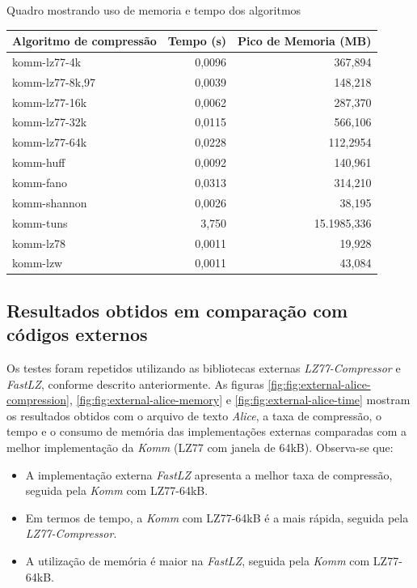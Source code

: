 \begin{quadro}[ht]
\caption{Quadro mostrando uso de memoria e tempo dos algoritmos}\label{quadro:resultados-komm-smiley}
\begin{tabular}{|l|r|r|}
    \hline
    \textbf{Algoritmo de compressão}& \textbf{Tempo (s)}  & \textbf{Pico de Memoria (MB)} \\ \hline
    komm-lz77-4k & 0,0096 & 367,894 \\ \hline
    komm-lz77-8k,97 & 0,0039 & 148,218 \\ \hline
    komm-lz77-16k & 0,0062 & 287,370 \\ \hline
    komm-lz77-32k & 0,0115 & 566,106 \\ \hline
    komm-lz77-64k & 0,0228 & 112,2954 \\ \hline
    komm-huff & 0,0092 & 140,961 \\ \hline
    komm-fano & 0,0313 & 314,210 \\ \hline
    komm-shannon & 0,0026 & 38,195 \\ \hline
    komm-tuns & 3,750 & 15.1985,336 \\ \hline
    komm-lz78 & 0,0011 & 19,928 \\ \hline
    komm-lzw & 0,0011 & 43,084 \\ \hline

\end{tabular}
\fonteproprioautor
\end{quadro}

\newpage
\newpage

\subsection{Resultados obtidos em comparação com códigos externos}

Os testes foram repetidos utilizando as bibliotecas externas \textit{LZ77-Compressor} e \textit{FastLZ}, conforme descrito anteriormente. As figuras \ref{fig:fig:external-alice-compression}, \ref{fig:fig:external-alice-memory} e \ref{fig:fig:external-alice-time} mostram os resultados obtidos com o arquivo de texto \textit{Alice}, a taxa de compressão, o tempo e o consumo de memória das implementações externas comparadas com a melhor implementação da \textit{Komm} (LZ77 com janela de 64kB). Observa-se que:
\begin{itemize}
  \item A implementação externa \textit{FastLZ} apresenta a melhor taxa de compressão, seguida pela \textit{Komm} com LZ77-64kB.
  \item Em termos de tempo, a \textit{Komm} com LZ77-64kB é a mais rápida, seguida pela \textit{LZ77-Compressor}.
  \item A utilização de memória é maior na \textit{FastLZ}, seguida pela \textit{Komm} com LZ77-64kB.
\end{itemize}

